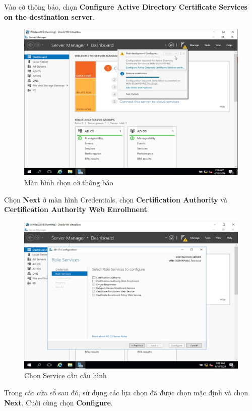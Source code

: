  Vào cờ thông báo, chọn \textbf{Configure Active Directory Certificate Services on the destination server}. 

\begin{figure}[!htb]
    \centering
    \includegraphics[width=0.9\linewidth]{figure//chapter4//lab4_1/configure_active_directory.png}
    \caption{Màn hình chọn cờ thông báo}
    \label{fig:enter-label}
\end{figure}

\noindent Chọn \textbf{Next} ở màn hình Credentials, chọn \textbf{Certification Authority} và \textbf{Certification Authority Web Enrollment}.

\begin{figure}[!htb]
    \centering
    \includegraphics[width=0.85\linewidth]{figure//chapter4//lab4_1/configure_service.png}
    \caption{Chọn Service cần cấu hình}
    \label{fig:enter-label}
\end{figure}

 Trong các cửa sổ sau đó, sử dụng các lựa chọn đã được chọn mặc định và chọn \textbf{Next}. Cuối cùng chọn \textbf{Configure}.

